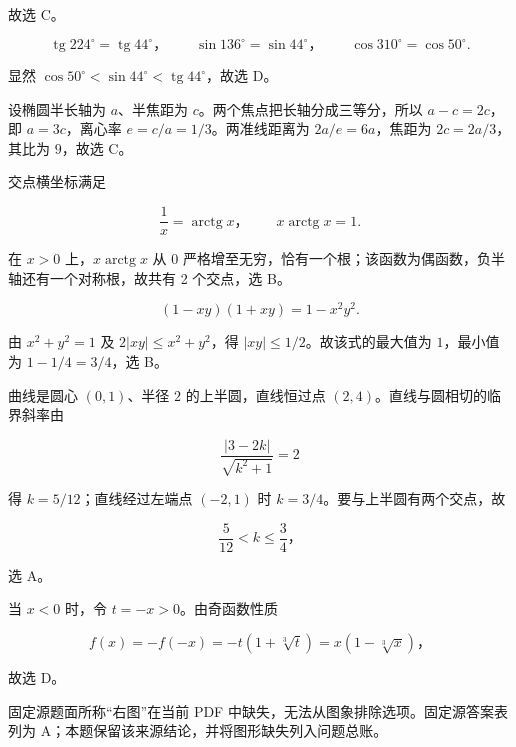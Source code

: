 \begin{answer}
故选 C。


\nopagebreak[4]
\[
\operatorname{tg}224^\circ=\operatorname{tg}44^\circ\text{，}
\qquad \sin136^\circ=\sin44^\circ\text{，}
\qquad \cos310^\circ=\cos50^\circ.
\]

显然 $\cos50^\circ<\sin44^\circ<\operatorname{tg}44^\circ$，故选 D。


设椭圆半长轴为 $a$、半焦距为 $c$。两个焦点把长轴分成三等分，所以 $a-c=2c$，即 $a=3c$，离心率 $e=c/a=1/3$。两准线距离为 $2a/e=6a$，焦距为 $2c=2a/3$，其比为 $9$，故选 C。


交点横坐标满足

\nopagebreak[4]
\[
\frac1x=\operatorname{arctg} x\text{，}
\qquad x\operatorname{arctg} x=1.
\]

在 $x>0$ 上，$x\operatorname{arctg} x$ 从 $0$ 严格增至无穷，恰有一个根；该函数为偶函数，负半轴还有一个对称根，故共有 2 个交点，选 B。


\nopagebreak[4]
\[
(1-xy)(1+xy)=1-x^2y^2.
\]

由 $x^2+y^2=1$ 及 $2|xy|\leq x^2+y^2$，得 $|xy|\leq1/2$。故该式的最大值为 $1$，最小值为 $1-1/4=3/4$，选 B。


曲线是圆心 $(0,1)$、半径 $2$ 的上半圆，直线恒过点 $(2,4)$。直线与圆相切的临界斜率由

\nopagebreak[4]
\[
\frac{|3-2k|}{\sqrt{k^2+1}}=2
\]

得 $k=5/12$；直线经过左端点 $(-2,1)$ 时 $k=3/4$。要与上半圆有两个交点，故

\nopagebreak[4]
\[
\frac5{12}<k\leq\frac34\text{，}
\]

选 A。


当 $x<0$ 时，令 $t=-x>0$。由奇函数性质

\nopagebreak[4]
\[
f(x)=-f(-x)=-t(1+\sqrt[3]{t})
=x(1-\sqrt[3]{x})\text{，}
\]

故选 D。


固定源题面所称“右图”在当前 PDF 中缺失，无法从图象排除选项。固定源答案表列为 A；本题保留该来源结论，并将图形缺失列入问题总账。



\end{answer}
